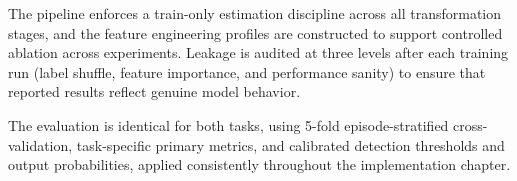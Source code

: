 The pipeline enforces a train-only estimation discipline across all transformation stages, and the feature engineering profiles are constructed to support controlled ablation across experiments. Leakage is audited at three levels after each training run (label shuffle, feature importance, and performance sanity) to ensure that reported results reflect genuine model behavior.

The evaluation is identical for both tasks, using 5-fold episode-stratified cross-validation, task-specific primary metrics, and calibrated detection thresholds and output probabilities, applied consistently throughout the implementation chapter.
